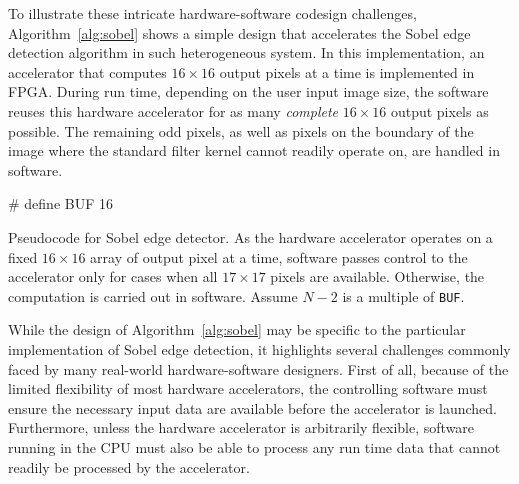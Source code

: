 To illustrate these intricate hardware-software codesign challenges, Algorithm~\ref{alg:sobel} shows a simple design that accelerates the Sobel edge detection algorithm in such heterogeneous system.  In this implementation, an accelerator that computes $16\times 16$ output pixels at a time is implemented in FPGA.  During run time, depending on the user input image size, the software reuses this hardware accelerator for as many \emph{complete} $16\times 16$ output pixels as possible.  The remaining odd pixels, as well as pixels on the boundary of the image where the standard filter kernel cannot readily operate on, are handled in software.

\IncMargin{1em}
\begin{algorithm}
\footnotesize
	\# define BUF 16
	\\
	\For{$r:=0$ \KwTo $N-1$}{
		\For{$c:=0$ \KwTo $N-1$}{
			\uIf{pixel[$r, c$] is edge}{
   				SW\textunderscore SOBEL( pixel, $r, c$ )\;
   			}\uElseIf{($(r-1)$ \% BUF) $==0$ \&\& \\ \quad \quad \quad$(c-1)$ \% BUF) $==0$}{
   				HW\textunderscore SOBEL( pixel, $r, c$ )\;
   			}\Else{
   				continue\;
   			}
		}
	}
	\caption{Pseudocode for Sobel edge detector.  As the hardware accelerator operates on a fixed $16\times 16$ array of output pixel at a time, software passes control to the accelerator only for cases when all $17 \times 17$ pixels are available.  Otherwise, the computation is carried out in software.  Assume $N-2$ is a multiple of \texttt{BUF}.}
	\label{alg:sobel}
\end{algorithm}
\DecMargin{1em}

While the design of Algorithm~\ref{alg:sobel} may be specific to the particular implementation of Sobel edge detection, it highlights several challenges commonly faced by many real-world hardware-software designers.  First of all, because of the limited flexibility of most hardware accelerators, the controlling software must ensure the necessary input data are available before the accelerator is launched.  Furthermore, unless the hardware accelerator is arbitrarily flexible, software running in the CPU must also be able to process any run time data that cannot readily be processed by the accelerator.


